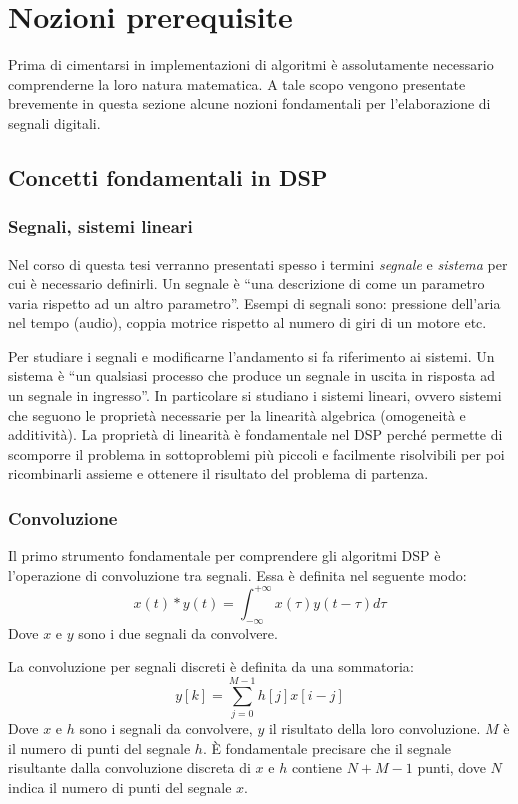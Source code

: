 \chapter{Nozioni prerequisite}
Prima di cimentarsi in implementazioni di algoritmi è assolutamente necessario comprenderne la loro natura matematica. A tale scopo vengono presentate brevemente in questa sezione alcune nozioni fondamentali per l'elaborazione di segnali digitali.

\section{Concetti fondamentali in DSP}
\subsection{Segnali, sistemi lineari}
Nel corso di questa tesi verranno presentati spesso i termini \textit{segnale} e \textit{sistema} per cui è necessario definirli. Un segnale è ``una descrizione di come un parametro varia rispetto ad un altro parametro''\cite{dspguide}. Esempi di segnali sono: pressione dell'aria nel tempo (audio), coppia motrice rispetto al numero di giri di un motore etc.

Per studiare i segnali e modificarne l'andamento si fa riferimento ai sistemi. Un sistema è ``un qualsiasi processo che produce un segnale in uscita in risposta ad un segnale in ingresso''\cite{dspguide}. In particolare si studiano i sistemi lineari, ovvero sistemi che seguono le proprietà necessarie per la linearità algebrica (omogeneità e additività). La proprietà di linearità è fondamentale nel DSP perché permette di scomporre il problema in sottoproblemi più piccoli e facilmente risolvibili per poi ricombinarli assieme e ottenere il risultato del problema di partenza.

\subsection{Convoluzione}
Il primo strumento fondamentale per comprendere gli algoritmi DSP è l'operazione di convoluzione tra segnali. Essa è definita nel seguente modo\cite{calandrino}:
\begin{equation}
    x(t) * y(t) = \int_{-\infty}^{+\infty}x(\tau)y(t-\tau)d\tau
\end{equation}
Dove $x$ e $y$ sono i due segnali da convolvere.

La convoluzione per segnali discreti è definita da una sommatoria\cite{dspguide}:
\begin{equation}
    y[k] = \displaystyle\sum_{j=0}^{M-1}h[j]x[i-j]
\end{equation}
Dove $x$ e $h$ sono i segnali da convolvere, $y$ il risultato della loro convoluzione. $M$ è il numero di punti del segnale $h$. È fondamentale precisare che il segnale risultante dalla convoluzione discreta di $x$ e $h$ contiene $N+M-1$ punti, dove $N$ indica il numero di punti del segnale $x$.


